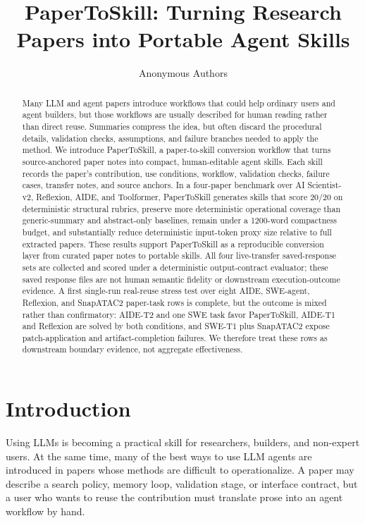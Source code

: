 \documentclass[letterpaper]{article}
\title{PaperToSkill: Turning Research Papers into Portable Agent Skills}
\author{
    Anonymous Authors
}
\begin{document}
\maketitle

\begin{abstract}
Many LLM and agent papers introduce workflows that could help ordinary users and
agent builders, but those workflows are usually described for human reading
rather than direct reuse. Summaries compress the idea, but often discard the
procedural details, validation checks, assumptions, and failure branches needed
to apply the method. We introduce PaperToSkill, a paper-to-skill conversion
workflow that turns source-anchored paper notes into compact, human-editable
agent skills. Each skill records the paper's contribution, use conditions,
workflow, validation checks, failure cases, transfer notes, and source anchors.
In a four-paper benchmark over AI Scientist-v2, Reflexion, AIDE, and
Toolformer, PaperToSkill generates skills that score 20/20 on deterministic
structural rubrics, preserve more deterministic operational coverage than
generic-summary and abstract-only baselines, remain under a 1200-word
compactness budget, and substantially reduce deterministic input-token proxy
size relative to full extracted papers. These results support PaperToSkill as a
reproducible conversion layer from curated paper notes to portable skills. All
four live-transfer saved-response sets are collected and scored under a
deterministic output-contract evaluator; these saved response files are not
human semantic fidelity or downstream execution-outcome evidence. A first
single-run real-reuse stress test over eight AIDE, SWE-agent, Reflexion, and
SnapATAC2 paper-task rows is complete, but the outcome is mixed rather than
confirmatory: AIDE-T2 and one SWE task favor PaperToSkill, AIDE-T1 and
Reflexion are solved by both conditions, and SWE-T1 plus SnapATAC2 expose
patch-application and artifact-completion failures. We therefore treat these
rows as downstream boundary evidence, not aggregate effectiveness.
\end{abstract}

\section{Introduction}

Using LLMs is becoming a practical skill for researchers, builders, and
non-expert users. At the same time, many of the best ways to use LLM agents are
introduced in papers whose methods are difficult to operationalize. A paper may
describe a search policy, memory loop, validation stage, or interface contract,
but a user who wants to reuse the contribution must translate prose into an
agent workflow by hand.
\end{document}

